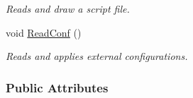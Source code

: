 \begin{DoxyCompactItemize}
\begin{DoxyCompactList}\small\item\em \-Reads and draw a script file. \end{DoxyCompactList}\item 
\hypertarget{classDraw_a6f390f3a650790d32dd2860703f57e98}{void \hyperlink{classDraw_a6f390f3a650790d32dd2860703f57e98}{\-Read\-Conf} ()}\label{classDraw_a6f390f3a650790d32dd2860703f57e98}

\begin{DoxyCompactList}\small\item\em \-Reads and applies external configurations. \end{DoxyCompactList}\end{DoxyCompactItemize}
\subsubsection*{\-Public \-Attributes}

